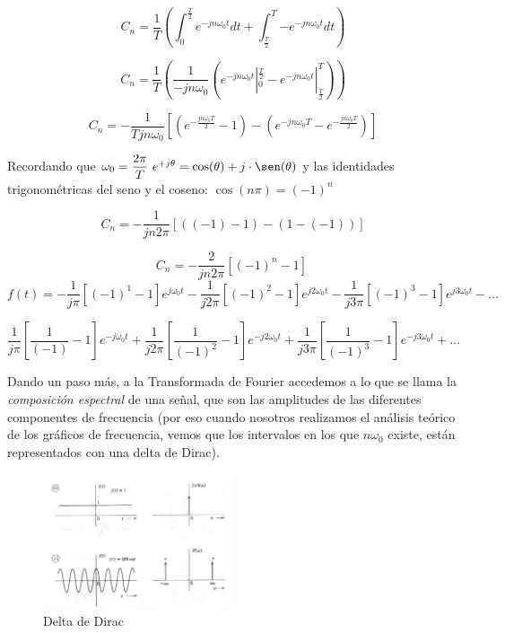 \documentclass[../main.tex]{subfiles}
\begin{document}
	\[
		C_{n} = \dfrac{1}{T}\left( \int_{0}^{\frac{T}{2}}e^{- jn\omega_{0}t}dt + \int_{\frac{T}{2}}^{T}{- e}^{- jn\omega_{0}t}dt \right)
	\]

	\[
		C_{n} = \dfrac{1}{T}\left( \frac{1}{- jn\omega_{0}}\left( e_{}^{- jn\omega_{0}t}|_{0}^{\frac{T}{2}} - e_{}^{- jn\omega_{0}t}|_{\frac{T}{2}}^{T} \right) \right)
	\]

	\[
		C_{n} = - \dfrac{1}{Tjn\omega_0} \left[\left(e^{-\frac{jn\omega_{0}T}{2}}-1\right)-\left(e^{-jn\omega_{0}T}-e^{-\frac{jn\omega_{0}T}{2}}\right)\right]
	\]


	Recordando que
	\(\omega_{0} = \dfrac{2\pi}{T}\ e^{+ j\theta} = \cos(\theta) + j\x \sen(\theta) \)
	y las identidades trigonométricas del seno y el coseno:
	\( \cos(n\pi) = (-1)^n \)

	\[
		C_{n} = - \dfrac{1}{jn2\pi}\left[\left(\left(-1\right)-1\right)-\left(1-\left(-1\right)\right)\right]
	\]

	\[
		C_{n} = - \dfrac{2}{jn2\pi}\left\lbrack ( - 1)^{n} - 1 \right\rbrack\ 
	\]
	\[
		f(t) = - \dfrac{1}{j\pi}\left\lbrack ( - 1 )^{1} - 1 \right\rbrack e^{j\omega_{0}t} - \frac{1}{j2\pi}\left\lbrack ( - 1)^{2} - 1 \right\rbrack e^{j2\omega_{0}t} - \frac{1}{j3\pi}\left\lbrack ( - 1 )^{3} - 1 \right\rbrack e^{j3\omega_{0}t} - \ldots
	\]

	\[
		\dfrac{1}{j\pi}\left\lbrack \frac{1}{(- 1)} - 1 \right\rbrack e^{- j\omega_{0}t} + \frac{1}{j2\pi}\left\lbrack \frac{1}{( - 1 )^{2}} - 1 \right\rbrack e^{- j2\omega_{0}t} + \frac{1}{j3\pi}\left\lbrack \frac{1}{( - 1 )^{3}} - 1 \right\rbrack e^{- j3\omega_{0}t} + \ldots\ 
	\]

	Dando un paso más, a la Transformada de Fourier accedemos a lo que se
	llama la \emph{composición espectral} de una señal, que son las
	amplitudes de las diferentes componentes de frecuencia (por eso cuando
	nosotros realizamos el análisis teórico de los gráficos de frecuencia,
	vemos que los intervalos en los que \(n\omega_{0}\) existe, están
	representados con una delta de Dirac).

	\begin{figure}[H]
	\includegraphics[width=0.5\textwidth]{fourier/volpa/image3.png}
	\centering
		\caption{Delta de Dirac}
	\end{figure}
\end{document}
